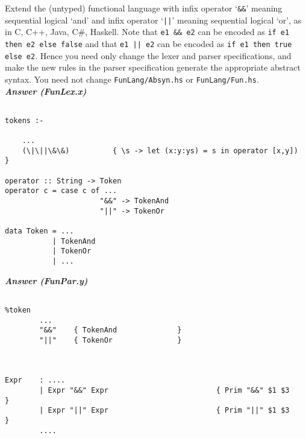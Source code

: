 \documentclass[a4paper]{article}
\begin{document}
\begin{exercise}\label{exer-fun-sequential-logical}
  Extend the (untyped) functional language with infix operator
  `\verb|&&|' meaning sequential logical `and' and infix operator
  `\verb+||+' meaning sequential logical `or', as in C, C++, Java,
  C\#, Haskell\@.  Note that \verb+e1 && e2+ can be encoded as \texttt{if
    e1 then e2 else false} and that \verb+e1 || e2+ can be encoded as
  \texttt{if e1 then true else e2}.  Hence you need only change the
  lexer and parser specifications, and make the new rules in the
  parser specification generate the appropriate abstract syntax.  You
  need not change \texttt{FunLang/Absyn.hs} or \texttt{FunLang/Fun.hs}\@.\\
  
  
\noindent
\textbf{\emph{Answer (FunLex.x)}} 
{\codesetup\begin{verbatim}

tokens :-

    ...
    (\|\||\&\&)          { \s -> let (x:y:ys) = s in operator [x,y])  }

operator :: String -> Token
operator c = case c of ... 
                      "&&" -> TokenAnd
                      "||" -> TokenOr
                      
data Token = ...
           | TokenAnd
           | TokenOr
           | ...
\end{verbatim}}

\noindent
\textbf{\emph{Answer (FunPar.y)}} 
{\codesetup\begin{verbatim}

%token  
        ...    
        "&&"    { TokenAnd              }
        "||"    { TokenOr               }



Expr    : ....
        | Expr "&&" Expr                         { Prim "&&" $1 $3        }
        | Expr "||" Expr                         { Prim "||" $1 $3        }
        ....
\end{verbatim}}

\end{exercise}
\end{document}
